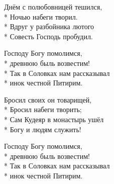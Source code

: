 \medskip

\begin{minipage}{\linewidth}
Днём с полюбовницей тешился,\\*
Ночью набеги творил.\\*
Вдруг у разбойника лютого\\*
Совесть Господь пробудил.\\
\end{minipage}\par\medskip\nobreak

\medskip

\begin{minipage}{\linewidth}
\hspace*{1.5em}Господу Богу помолимся,\\*
\hspace*{1.5em}древнюю быль возвестим! \\*
\hspace*{1.5em}Так в Соловках нам рассказывал\\*
\hspace*{1.5em}инок честной Питирим.\\
\end{minipage}\par\medskip\nobreak

\medskip

\begin{minipage}{\linewidth}
Бросил своих он товарищей,\\*
Бросил набеги творить;\\*
Сам Кудеяр в монастырь ушёл\\*
Богу и людям служить!\\
\end{minipage}\par\medskip\nobreak

\medskip

\begin{minipage}{\linewidth}
\hspace*{1.5em}Господу Богу помолимся,\\*
\hspace*{1.5em}древнюю быль возвестим! \\*
\hspace*{1.5em}Так в Соловках нам рассказывал\\*
\hspace*{1.5em}инок честной Питирим.\\
\end{minipage}

\vspace{\fill}\newpage

